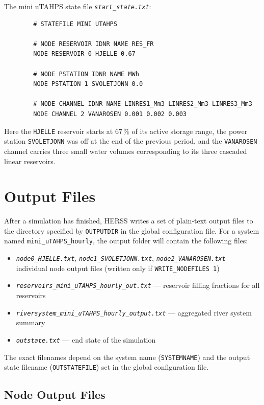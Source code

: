 \documentclass[a4paper, 12pt]{report}
\newcommand{\file}[1]{\textit{\texttt{#1}}}  %
\begin{document}
	The mini uTAHPS state file \file{start\_state.txt}:
	
	\begin{verbatim}
		# STATEFILE MINI UTAHPS
		
		# NODE RESERVOIR IDNR NAME RES_FR
		NODE RESERVOIR 0 HJELLE 0.67
		
		# NODE PSTATION IDNR NAME MWh
		NODE PSTATION 1 SVOLETJONN 0.0
		
		# NODE CHANNEL IDNR NAME LINRES1_Mm3 LINRES2_Mm3 LINRES3_Mm3
		NODE CHANNEL 2 VANAROSEN 0.001 0.002 0.003
	\end{verbatim}
	
	Here the \texttt{HJELLE} reservoir starts at 67\,\% of its active storage range, the
	power station \texttt{SVOLETJONN} was off at the end of the previous period, and the
	\texttt{VANAROSEN} channel carries three small water volumes corresponding to its three
	cascaded linear reservoirs.



	\section{Output Files}
	\label{sec:output}

	After a simulation has finished, HERSS writes a set of plain-text output files to the
	directory specified by \texttt{OUTPUTDIR} in the global configuration file. For a system
	named \texttt{mini\_uTAHPS\_hourly}, the output folder will contain the following files:

	\begin{itemize}
	\item \file{node0\_HJELLE.txt}, \file{node1\_SVOLETJONN.txt}, \file{node2\_VANAROSEN.txt} --- individual node output files (written only if \texttt{WRITE\_NODEFILES 1})
	\item \file{reservoirs\_mini\_uTAHPS\_hourly\_out.txt} --- reservoir filling fractions for all reservoirs
	\item \file{riversystem\_mini\_uTAHPS\_hourly\_output.txt} --- aggregated river system summary
	\item \file{outstate.txt} --- end state of the simulation
	\end{itemize}

	The exact filenames depend on the system name (\texttt{SYSTEMNAME}) and the output state
	filename (\texttt{OUTSTATEFILE}) set in the global configuration file.

	\subsection{Node Output Files}
\end{document}
